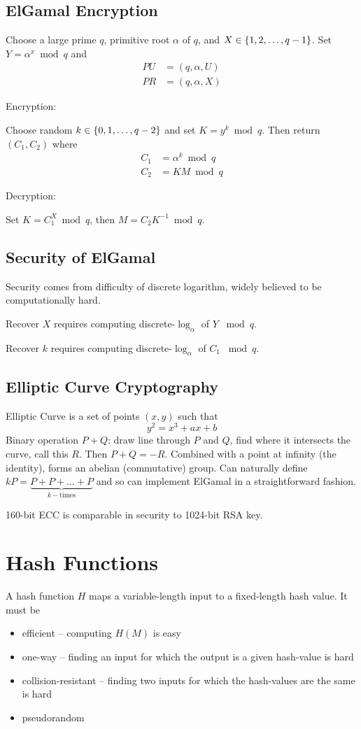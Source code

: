\documentclass[draft]{article}
\begin{document}
\begin{multicols}{2}
    \subsection{ElGamal Encryption}
    Choose a large prime $q$, primitive root $\alpha$ of $q$, and $X \in \left\lbrace1, 2, \hdots, q - 1\right\rbrace$. Set $Y = \alpha^x\bmod{q}$ and \begin{align*}PU&=(q,\alpha,U)\\PR&=(q,\alpha,X)\end{align*}

    Encryption:

    Choose random $k\in\left\lbrace0,1,\hdots, q-2\right\rbrace$ and set $K=y^k\bmod{q}$. Then return $(C_1, C_2)$ where \begin{align*}C_1&=\alpha^k\bmod{q}\\C_2&=KM\bmod{q}\end{align*}

    Decryption:

    Set $K=C_1^X\bmod{q}$, then $M = C_2K^{-1}\bmod{q}$.

    \subsection{Security of ElGamal}
    Security comes from difficulty of discrete logarithm, widely believed to be computationally hard.

    Recover $X$ requires computing discrete-$\log_{\alpha}$ of $Y$ $\bmod{q}$.

    Recover $k$ requires computing discrete-$\log_{\alpha}$ of $C_1$ $\bmod{q}$.
    \subsection{Elliptic Curve Cryptography}
    Elliptic Curve is a set of points $(x,y)$ such that \[y^2=x^3+ax+b\] Binary operation $P + Q$: draw line through $P$ and $Q$, find where it intersects the curve, call this $R$. Then $P+Q = -R$. Combined with a point at infinity (the identity), forms an abelian (commutative) group. Can naturally define $kP = \underbrace{P + P + \dots + P}_{k-\text{times}}$ and so can implement ElGamal in a straightforward fashion.

    160-bit ECC is comparable in security to 1024-bit RSA key.
\end{multicols}
\section{Hash Functions}
A hash function $H$ maps a variable-length input to a fixed-length hash value. It must be
\begin{itemize}[nosep]
    \item efficient -- computing $H(M)$ is easy
    \item one-way -- finding an input for which the output is a given hash-value is hard
    \item collision-resistant -- finding two inputs for which the hash-values are the same is hard
    \item pseudorandom
\end{itemize}
\end{document}
